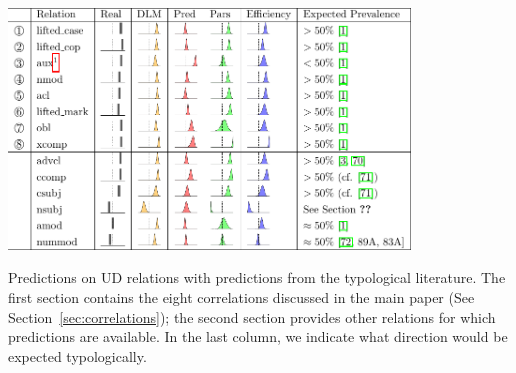 \documentclass[10pt,twoside,lineno]{article}
\begin{document}
\begin{table} %
	\begin{center}	
\includegraphics[width=0.8\textwidth]{si-table-perrel-1-1.png}
\end{center}
\caption{Predictions on UD relations with predictions from the typological literature.
The first section contains the eight correlations discussed in the main paper (See Section~\ref{sec:correlations}); the second section provides other relations for which predictions are available. In the last column, we indicate what direction would be expected typologically.}
\label{tab:all-predictions-1}
\end{table}
\end{document}
